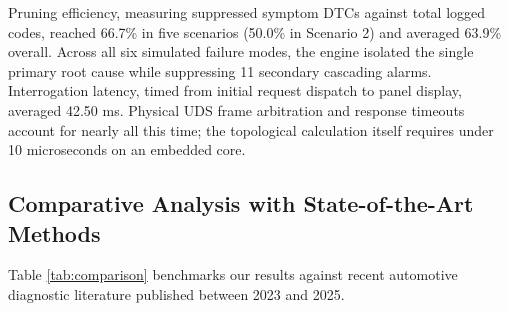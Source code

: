 \documentclass[conference]{IEEEtran}
\begin{document}
\begin{table}[htbp]
\caption{Fault Isolation Performance Across Simulated Failure Modes}
\label{tab:benchmarks}
\centering
{}
\end{table}

Pruning efficiency, measuring suppressed symptom DTCs against total logged codes, reached 66.7\% in five scenarios (50.0\% in Scenario 2) and averaged 63.9\% overall. Across all six simulated failure modes, the engine isolated the single primary root cause while suppressing 11 secondary cascading alarms. Interrogation latency, timed from initial request dispatch to panel display, averaged 42.50 ms. Physical UDS frame arbitration and response timeouts account for nearly all this time; the topological calculation itself requires under 10 microseconds on an embedded core.

\subsection{Comparative Analysis with State-of-the-Art Methods}
Table \ref{tab:comparison} benchmarks our results against recent automotive diagnostic literature published between 2023 and 2025.
\end{document}
